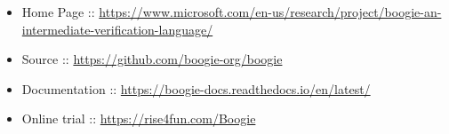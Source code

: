 \documentclass[12pt,twoside]{article}
\begin{document}
\begin{itemize}[noitemsep,topsep=\mdcompacttopsep]%

\item{}Home Page :: \href{https://www.microsoft.com/en-us/research/project/boogie-an-intermediate-verification-language/}{{\ttfamily https://\hspace{0pt}www.\hspace{0pt}microsoft.\hspace{0pt}com/\hspace{0pt}en-\hspace{0pt}us/\hspace{0pt}research/\hspace{0pt}project/\hspace{0pt}boogie-\hspace{0pt}an-\hspace{0pt}intermediate-\hspace{0pt}verification-\hspace{0pt}language/\hspace{0pt}}}%

\item{}Source :: \href{https://github.com/boogie-org/boogie}{{\ttfamily https://\hspace{0pt}github.\hspace{0pt}com/\hspace{0pt}boogie-\hspace{0pt}org/\hspace{0pt}boogie}}%

\item{}Documentation :: \href{https://boogie-docs.readthedocs.io/en/latest/}{{\ttfamily https://\hspace{0pt}boogie-\hspace{0pt}docs.\hspace{0pt}readthedocs.\hspace{0pt}io/\hspace{0pt}en/\hspace{0pt}latest/\hspace{0pt}}}%

\item{}Online trial :: \href{https://rise4fun.com/Boogie}{{\ttfamily https://\hspace{0pt}rise4fun.\hspace{0pt}com/\hspace{0pt}Boogie}}%
\end{itemize}%
\end{document}
